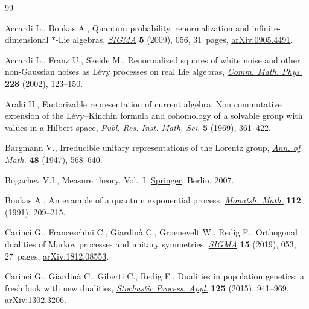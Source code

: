 \documentclass[10pt,a4paper]{amsart}
\numberwithin{equation}{section}
\newcommand{\1}{\mathbbm{1}}
\begin{document}
%
%


\begin{thebibliography}{99}
\footnotesize\itemsep=0pt

Accardi L., Boukas A., Quantum probability, renormalization and
 infinite-dimensional {$\ast$}-{L}ie algebras, \href{https://doi.org/10.3842/SIGMA.2009.056}{\textit{SIGMA}} \textbf{5}
 (2009), 056, 31~pages, \href{https://arxiv.org/abs/0905.4491}{arXiv:0905.4491}.

Accardi L., Franz U., Skeide M., Renormalized squares of white noise and other
 non-{G}aussian noises as {L}\'evy processes on real {L}ie algebras,
 \href{https://doi.org/10.1007/s002200200647}{\textit{Comm. Math. Phys.}} \textbf{228} (2002), 123--150.

Araki H., Factorizable representation of current algebra. {N}on commutative
 extension of the {L}\'evy--{K}inchin formula and cohomology of a solvable
 group with values in a {H}ilbert space, \href{https://doi.org/10.2977/prims/1195194390}{\textit{Publ. Res. Inst. Math. Sci.}}
 \textbf{5} (1969), 361--422.

Bargmann V., Irreducible unitary representations of the {L}orentz group,
 \href{https://doi.org/10.2307/1969129}{\textit{Ann. of Math.}} \textbf{48} (1947), 568--640.

Bogachev V.I., Measure theory. {V}ol.~{I}, \href{https://doi.org/10.1007/978-3-540-34514-5}{Springer}, Berlin, 2007.

Boukas A., An example of a quantum exponential process, \href{https://doi.org/10.1007/BF01297339}{\textit{Monatsh. Math.}}
 \textbf{112} (1991), 209--215.

Carinci G., Franceschini C., Giardin\`a C., Groenevelt W., Redig F., Orthogonal
 dualities of {M}arkov processes and unitary symmetries, \href{https://doi.org/10.3842/SIGMA.2019.053}{\textit{SIGMA}}
 \textbf{15} (2019), 053, 27~pages, \href{https://arxiv.org/abs/1812.08553}{arXiv:1812.08553}.

Carinci G., Giardin\`a C., Giberti C., Redig F., Dualities in population
 genetics: a fresh look with new dualities, \href{https://doi.org/10.1016/j.spa.2014.10.009}{\textit{Stochastic Process. Appl.}}
 \textbf{125} (2015), 941--969, \href{https://arxiv.org/abs/1302.3206}{arXiv:1302.3206}.


\end{thebibliography}
\end{document}
